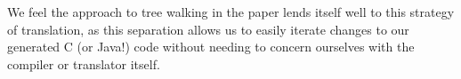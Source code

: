 \documentclass[times]{speauth}
\begin{document}
We feel the approach to tree walking in the paper lends itself well to this strategy of translation, as this separation allows us to easily iterate changes to our generated C (or Java!) code without needing to concern ourselves with the compiler or translator itself.


\end{document}
